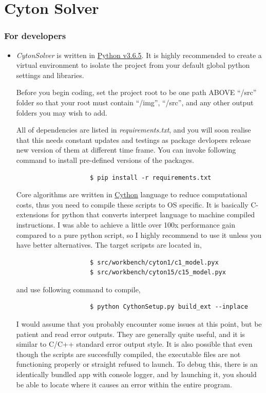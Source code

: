 \documentclass{article}
\newcommand{\enterProblemHeader}[1]{
    }
\newcommand{\exitProblemHeader}[1]{
    }
\newcounter{homeworkProblemCounter} %
\newcommand{\homeworkProblemName}{}
\newenvironment{homeworkProblem}[1][Problem \arabic{homeworkProblemCounter}]{ %
    \stepcounter{homeworkProblemCounter} %
    \renewcommand{\homeworkProblemName}{#1} %
    \section{\homeworkProblemName} %
    \enterProblemHeader{\homeworkProblemName} %
    }{
    \exitProblemHeader{\homeworkProblemName} %
    }
\begin{document}
\begin{homeworkProblem}[Cyton Solver]
            \subsubsection{For developers}
            \begin{itemize}
                \item \textit{CytonSolver} is written in \href{https://www.python.org/downloads/release/python-365/}{Python v3.6.5}. It is highly recommended to create a virtual environment to isolate the project from your default global python settings and libraries.

                Before you begin coding, set the project root to be one path ABOVE ``/src'' folder so that your root must contain ``/img'', ``/src'', and any other output folders you may wish to add.
    
                All of dependencies are listed in \textit{requirements.txt}, and you will soon realise that this needs constant updates and testings as package devlopers release new version of them at different time frame. You can invoke following command to install pre-defined versions of the packages.
                \begin{lstlisting}
                    $ pip install -r requirements.txt
                \end{lstlisting}
                Core algorithms are written in \href{https://cython.org/#documentation}{Cython} language to reduce computational costs, thus you need to compile these scripts to OS specific. It is basically C-extensions for python that converts interpret language to machine compiled instructions. I was able to achieve a little over 100x performance gain compared to a pure python script, so I highly recommend to use it unless you have better alternatives. The target scripsts are located in,
                \begin{lstlisting}
                    $ src/workbench/cyton1/c1_model.pyx
                    $ src/workbench/cyton15/c15_model.pyx
                \end{lstlisting}
                and use following command to compile,
                \begin{lstlisting}
                    $ python CythonSetup.py build_ext --inplace
                \end{lstlisting}
                I would assume that you probably encounter some issues at this point, but be patient and read error outputs. They are generally quite useful, and it is similar to C/C++ standard error output style. It is also possible that even though the scripts are succesfully compiled, the executable files are not functioning properly or straight refused to launch. To debug this, there is an identically bundled app with console logger, and by launching it, you should be able to locate where it causes an error within the entire program.


\end{itemize}
\end{homeworkProblem}
\end{document}
